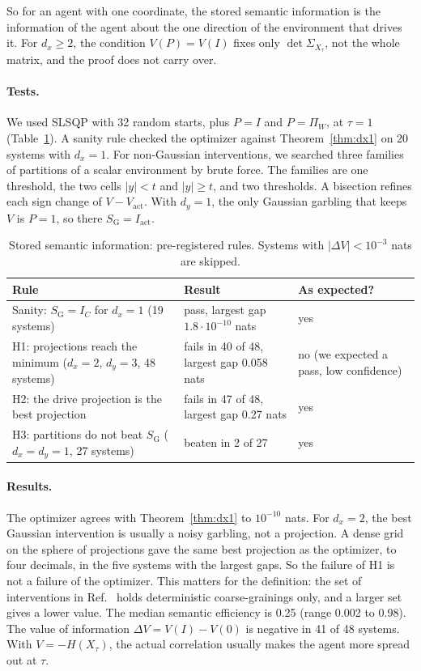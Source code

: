 \documentclass[11pt]{article}
\newcommand{\Vact}{V_{\mathrm{act}}}
\newcommand{\Iact}{I_{\mathrm{act}}}
\newcommand{\SG}{S_{\mathrm{G}}}
\begin{document}
So for an agent with one coordinate, the stored semantic information is the information of the agent about the one
direction of the environment that drives it. For $d_x\ge2$, the condition $V(P)=V(I)$ fixes only $\det\Sigma_{X_\tau}$,
not the whole matrix, and the proof does not carry over.

\paragraph{Tests.} We used SLSQP with 32 random starts, plus $P=I$ and $P=\Pi_W$, at $\tau=1$
(Table~\ref{tab:b2}). A sanity rule checked the optimizer against Theorem~\ref{thm:dx1} on 20 systems with $d_x=1$.
For non-Gaussian interventions, we searched three families of partitions of a scalar environment by brute force. The
families are one threshold, the two cells $|y|<t$ and $|y|\ge t$, and two thresholds. A bisection refines each sign
change of $V-\Vact$. With $d_y=1$, the only Gaussian garbling that keeps $V$ is $P=1$, so there $\SG=\Iact$.

\begin{table}[t]
\centering
\caption{Stored semantic information: pre-registered rules. Systems with $|\Delta V|<10^{-3}$ nats are skipped.}
\label{tab:b2}
\begin{tabular}{p{6.2cm}p{5.2cm}p{2.6cm}}
\toprule
Rule & Result & As expected? \\
\midrule
Sanity: $\SG=I_C$ for $d_x=1$ (19 systems) & pass, largest gap $1.8\cdot10^{-10}$ nats & yes \\
H1: projections reach the minimum ($d_x=2$, $d_y=3$, 48 systems) & fails in 40 of 48, largest gap 0.058 nats & no (we expected a pass, low confidence) \\
H2: the drive projection is the best projection & fails in 47 of 48, largest gap 0.27 nats & yes \\
H3: partitions do not beat $\SG$ ($d_x=d_y=1$, 27 systems) & beaten in 2 of 27 & yes \\
\bottomrule
\end{tabular}
\end{table}

\paragraph{Results.} The optimizer agrees with Theorem~\ref{thm:dx1} to $10^{-10}$ nats. For $d_x=2$, the best Gaussian
intervention is usually a noisy garbling, not a projection. A dense grid on the sphere of projections gave the same
best projection as the optimizer, to four decimals, in the five systems with the largest gaps. So the failure of H1 is
not a failure of the optimizer. This matters for the definition: the set of interventions in
Ref.~\cite{KolchinskyWolpert18} holds deterministic coarse-grainings only, and a larger set gives a lower value. The
median semantic efficiency is 0.25 (range 0.002 to 0.98). The value of information $\Delta V=V(I)-V(0)$ is negative in
41 of 48 systems. With $V=-H(X_\tau)$, the actual correlation usually makes the agent more spread out at $\tau$.
\end{document}
